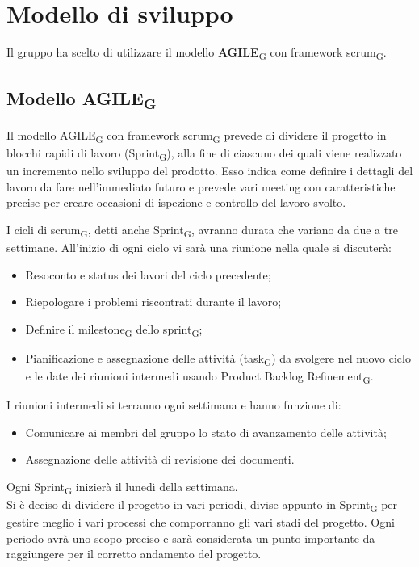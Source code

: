 \section{Modello di sviluppo}
Il gruppo ha scelto di utilizzare il modello \textbf{AGILE}\textsubscript{G} con framework scrum\textsubscript{G}.

\subsection{Modello AGILE\textsubscript{G}}
Il modello AGILE\textsubscript{G} con framework scrum\textsubscript{G} prevede di dividere il progetto in blocchi rapidi di lavoro (Sprint\textsubscript{G}),
alla fine di ciascuno dei quali viene realizzato un incremento nello sviluppo del prodotto. 
Esso indica come definire i dettagli del lavoro da fare nell'immediato futuro e prevede 
vari meeting con caratteristiche precise per creare occasioni di ispezione e controllo del lavoro svolto.

I cicli di scrum\textsubscript{G}, detti anche Sprint\textsubscript{G}, avranno durata che variano da due a tre settimane. All'inizio di ogni ciclo vi sarà una riunione nella quale si discuterà:
\begin{itemize}
	\item Resoconto e status dei lavori del ciclo precedente;
	\item Riepologare i problemi riscontrati durante il lavoro;
	\item Definire il milestone\textsubscript{G} dello sprint\textsubscript{G};
	\item Pianificazione e assegnazione delle attività (task\textsubscript{G}) da svolgere nel nuovo ciclo e le date dei riunioni intermedi usando Product Backlog Refinement\textsubscript{G}.
\end{itemize}
I riunioni intermedi si terranno ogni settimana e hanno funzione di:
\begin{itemize}
	\item Comunicare ai membri del gruppo lo stato di avanzamento delle attività;
	\item Assegnazione delle attività di revisione dei documenti.
\end{itemize}
Ogni Sprint\textsubscript{G} inizierà il lunedì della settimana.\\
Si è deciso di dividere il progetto in vari periodi, divise appunto in Sprint\textsubscript{G} per gestire meglio i vari processi che comporranno gli vari stadi del progetto. Ogni periodo avrà uno scopo preciso e sarà considerata un punto importante da raggiungere per il corretto andamento del progetto.

